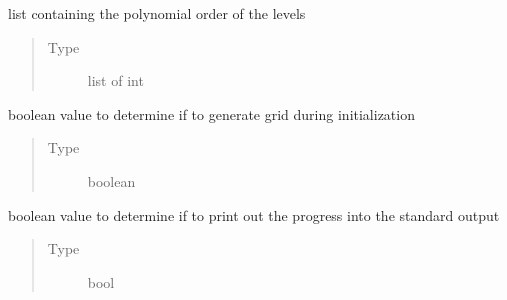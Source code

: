 \documentclass[letterpaper,10pt,english,openany,oneside]{sphinxmanual}
\begin{document}
\begin{fulllineitems}
\begin{fulllineitems}
\end{fulllineitems}


\begin{fulllineitems}
\label{\detokenize{pygpc:pygpc.Grid.SparseGrid.order_sequence}}
list containing the polynomial order of the levels
\begin{quote}\begin{description}
\item[{Type}] \leavevmode
list of int

\end{description}\end{quote}

\end{fulllineitems}


\begin{fulllineitems}
\label{\detokenize{pygpc:pygpc.Grid.SparseGrid.make_grid}}
boolean value to determine if to generate grid during initialization
\begin{quote}\begin{description}
\item[{Type}] \leavevmode
boolean

\end{description}\end{quote}

\end{fulllineitems}


\begin{fulllineitems}
\label{\detokenize{pygpc:pygpc.Grid.SparseGrid.verbose}}
boolean value to determine if to print out the progress into the standard output
\begin{quote}\begin{description}
\item[{Type}] \leavevmode
bool

\end{description}\end{quote}

\end{fulllineitems}



\end{fulllineitems}
\end{document}
